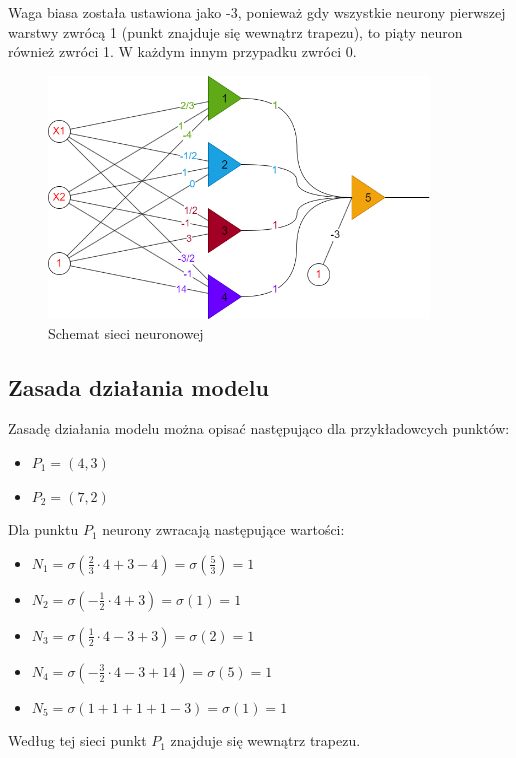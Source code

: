 \documentclass{article}
\begin{document}
Waga biasa została ustawiona jako -3, ponieważ gdy wszystkie neurony
pierwszej warstwy zwrócą 1 (punkt znajduje się wewnątrz trapezu), to piąty
neuron również zwróci 1. W każdym innym przypadku zwróci 0.

\begin{figure}[H]
    \centering
    \includegraphics[width=0.9\textwidth]{Zad4/sieć.png}
    \caption{Schemat sieci neuronowej}
\end{figure}

\subsection{Zasada działania modelu}

Zasadę działania modelu można opisać następująco dla przykładowcych punktów:

\begin{itemize}
    \centering
    \item $P_1 = (4, 3)$
    \item $P_2 = (7, 2)$
\end{itemize}
Dla punktu $P_1$ neurony zwracają następujące wartości:
\begin{itemize}
    \centering
    \item $N_1 = \sigma(\frac{2}{3}\cdot4 + 3 - 4) = \sigma(\frac{5}{3}) = 1$
    \item $N_2 = \sigma(-\frac{1}{2}\cdot4 + 3) = \sigma(1) = 1$
    \item $N_3 = \sigma(\frac{1}{2}\cdot4 - 3 + 3) = \sigma(2) = 1$
    \item $N_4 = \sigma(-\frac{3}{2}\cdot4 - 3 + 14) = \sigma(5) = 1$
    \item $N_5 = \sigma(1 + 1 + 1 + 1 - 3) = \sigma(1) = 1$
\end{itemize}
Według tej sieci punkt $P_1$ znajduje się wewnątrz trapezu.
\end{document}
